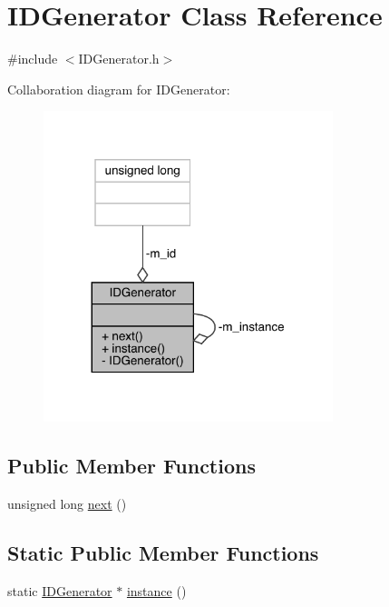 \hypertarget{class_i_d_generator}{}\section{I\+D\+Generator Class Reference}
\label{class_i_d_generator}


{\ttfamily \#include $<$I\+D\+Generator.\+h$>$}



Collaboration diagram for I\+D\+Generator\+:\nopagebreak
\begin{figure}[H]
\begin{center}
\leavevmode
\includegraphics[width=239pt]{class_i_d_generator__coll__graph}
\end{center}
\end{figure}
\subsection*{Public Member Functions}
\begin{DoxyCompactItemize}
\item 
unsigned long \mbox{\hyperlink{class_i_d_generator_a99d8cabb2ec6a17888a8ccbe9c85fee0}{next}} ()
\end{DoxyCompactItemize}
\subsection*{Static Public Member Functions}
\begin{DoxyCompactItemize}
\item 
static \mbox{\hyperlink{class_i_d_generator}{I\+D\+Generator}} $\ast$ \mbox{\hyperlink{class_i_d_generator_ad852c6dadc89e1020e4b3932f5a97bb3}{instance}} ()
\end{DoxyCompactItemize}
